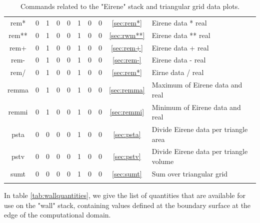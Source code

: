 \documentclass[a4paper,10pt]{report}
\begin{document}
\begin{center}
\begin{longtable}{|c|c|c|c|c|c|c|c|c|l|}
    rem* \index{b2plot, rem*}      & 0 & 1 & 0 & 0 & 1 & 0 & 0 & \ref{sec:rem*}     & Eirene data * real \\
    rem** \index{b2plot, rem**}    & 0 & 1 & 0 & 0 & 1 & 0 & 0 & \ref{sec:rwm**}    & Eirene data ** real \\
    rem+ \index{b2plot, rem+}      & 0 & 1 & 0 & 0 & 1 & 0 & 0 & \ref{sec:rem+}     & Eirene data + real \\
    rem- \index{b2plot, rem-}      & 0 & 1 & 0 & 0 & 1 & 0 & 0 & \ref{sec:rem-}     & Eirene data - real \\
    rem/ \index{b2plot, rem/}      & 0 & 1 & 0 & 0 & 1 & 0 & 0 & \ref{sec:rem*}     & Eirne data / real \\
    remma \index{b2plot, remma}    & 0 & 1 & 0 & 0 & 1 & 0 & 0 & \ref{sec:remma}    & Maximum of Eirene data and real \\
    remmi \index{b2plot, remmi}    & 0 & 1 & 0 & 0 & 1 & 0 & 0 & \ref{sec:remmi}    & Minimum of Eirene data and real \\
    psta \index{b2plot, psta}      & 0 & 0 & 0 & 0 & 1 & 0 & 0 & \ref{sec:psta}     & Divide Eirene data per triangle area \\
    pstv \index{b2plot, pstv}      & 0 & 0 & 0 & 0 & 1 & 0 & 0 & \ref{sec:pstv}     & Divide Eirene data per triangle volume \\
    sumt \index{b2plot, sumt}      & 0 & 0 & 0 & 0 & 1 & 0 & 0 & \ref{sec:sumt}     & Sum over triangular grid \\
    \hline
    \caption{Commands related to the "Eirene" stack and triangular grid data plots.}
    \label{tab:eirenecommands}
  \end{longtable}
\end{center}

In table \ref{tab:wallquantities}, we give the list of quantities that
are available for use on the "wall" stack, containing values defined at the boundary surface
at the edge of the computational domain.
\end{document}
